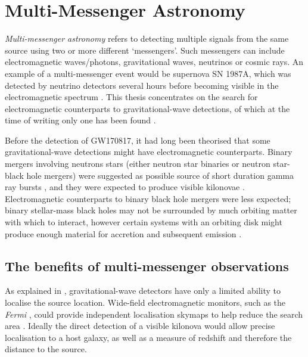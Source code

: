 \section{Multi-Messenger Astronomy}
\label{sec:multi}
\begin{colsection}


\begin{colsection}

\emph{Multi-messenger astronomy} refers to detecting multiple signals from the same source using two or more different `messengers'. Such messengers can include electromagnetic waves/photons, gravitational waves, neutrinos or cosmic rays. An example of a multi-messenger event would be supernova SN 1987A, which was detected by neutrino detectors several hours before becoming visible in the electromagnetic spectrum \citep{SN1987A}. This thesis concentrates on the search for electromagnetic counterparts to gravitational-wave detections, of which at the time of writing only one has been found \citep[GW170817;][]{GW170817}.

Before the detection of GW170817, it had long been theorised that some gravitational-wave detections might have electromagnetic counterparts. Binary mergers involving neutrons stars (either neutron star binaries or neutron star-black hole mergers) were suggested as possible source of short duration gamma ray bursts \citep{SGRBs}, and they were expected to produce visible kilonovae \citep{BNSNSBH_EM, BNS_EM}. Electromagnetic counterparts to binary black hole mergers were less expected; binary stellar-mass black holes may not be surrounded by much orbiting matter with which to interact, however certain systems with an orbiting disk might produce enough material for accretion and subsequent emission \citep{BBH_EM}.

\end{colsection}


\subsection{The benefits of multi-messenger observations}
\label{sec:mma_benefits}
\begin{colsection}

As explained in , gravitational-wave detectors have only a limited ability to localise the source location. Wide-field electromagnetic monitors, such as the \textit{Fermi} , could provide independent localisation skymaps to help reduce the search area \citep[note the \textit{Fermi} skymap included in ]{GW170817_GRB}. Ideally the direct detection of a visible kilonova would allow precise localisation to a host galaxy, as well as a measure of redshift and therefore the distance to the source.


\end{colsection}
\end{colsection}
